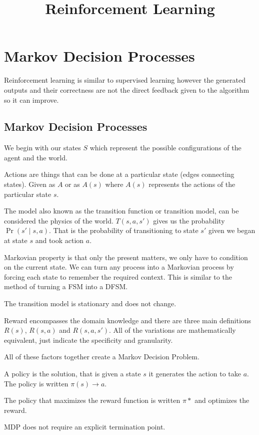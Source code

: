 \documentclass{article}
\title{Reinforcement Learning}
\author{}
\date{}
\begin{document}
\nocite{*}
\maketitle
\section{Markov Decision Processes}
Reinforcement learning is similar to supervised learning however the generated
outputs and their correctness are not the direct feedback given to the algorithm
so it can improve.

\subsection{Markov Decision Processes}

We begin with our states $S$ which represent the possible configurations of the
agent and the world.

Actions are things that can be done at a particular state (edges connecting
states). Given as $A$ or as $A(s)$ where $A(s)$ represents the actions of the
particular state $s$.

The model also known as the transition function or transition model, can be
considered the physics of the world. $T(s,a,s')$ gives us the probability
$\Pr(s'\mid s,a)$. That is the probability of transitioning to state $s'$ given
we began at state $s$ and took action $a$.

Markovian property is that only the present matters, we only have to condition
on the current state. We can turn any process into a Markovian process by
forcing each state to remember the required context. This is similar to the
method of turning a FSM into a DFSM.

The transition model is stationary and does not change.

Reward encompasses the domain knowledge and there are three main definitions
$R(s)$, $R(s,a)$ and $R(s,a,s')$. All of the variations are mathematically
equivalent, just indicate the specificity and granularity.

All of these factors together create a Markov Decision Problem.

A policy is the solution, that is given a state $s$ it generates the action to
take $a$. The policy is written $\pi(s) \rightarrow a$.

The policy that maximizes the reward function is written $\pi*$ and optimizes
the reward.

MDP does not require an explicit termination point.
\end{document}
